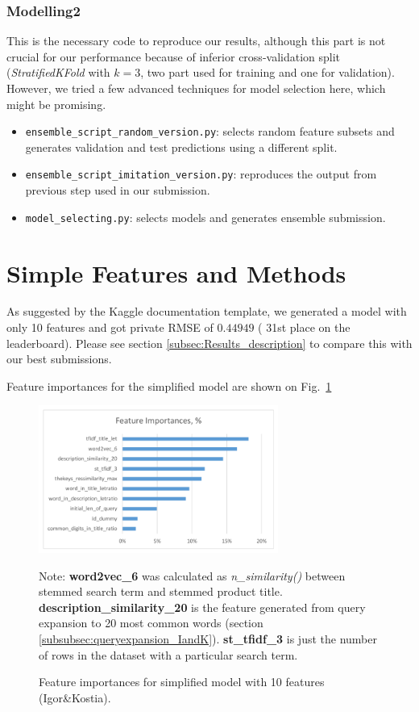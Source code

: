\documentclass[12pt]{article}
\begin{document}
\subsubsection{Modelling2}
This is the necessary code to reproduce our results, although this part is not crucial for our performance because of inferior cross-validation split (\emph{StratifiedKFold} with $k=3$, two part used for training and one for validation). However, we tried a few advanced techniques for model selection here, which might be promising.
\begin{itemize}
\item \texttt{ensemble\_script\_random\_version.py}: selects random feature subsets and generates validation and test predictions using a different split.
\item \texttt{ensemble\_script\_imitation\_version.py}: reproduces the output from previous step used in our submission.
\item \texttt{model\_selecting.py}: selects models and generates ensemble submission.
\end{itemize}




\section{Simple Features and Methods}
\label{sec:simplified}
As suggested by the Kaggle documentation template, we generated a model with only 10 features  and got private RMSE of $0.44949$ ( 31st place on the leaderboard). Please see
section \ref{subsec:Results_description} to compare this with our best submissions.

Feature importances for the simplified model are shown on Fig.~\ref{Fig:feature_importance_simplified_IandK}

\begin{figure}
  \centering
  \includegraphics[width=0.7\textwidth]{../Fig/plot_feature_importances_simplified_model.pdf}\\
  \caption{Feature importances for simplified model with 10 features (Igor\&Kostia).}
  \label{Fig:feature_importance_simplified_IandK}
Note: \textbf{word2vec\_6} was calculated as \emph{n\_similarity()} between stemmed search term and stemmed product title.
\textbf{description\_similarity\_20} is the feature generated from query expansion to 20 most common words (section \ref{subsubsec:queryexpansion_IandK}). \textbf{st\_tfidf\_3} is just the number of rows in the dataset with a particular search term.
\end{figure}
\end{document}
